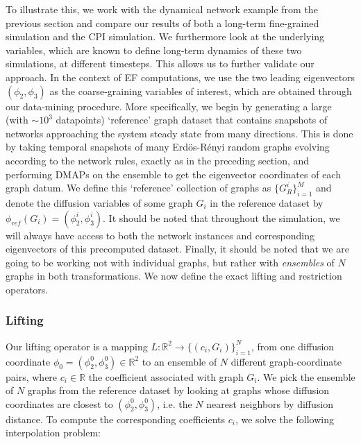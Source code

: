 To illustrate this, we work with the dynamical network example from
the previous section and compare our results of both a long-term
fine-grained simulation and the CPI simulation. We furthermore look at
the underlying variables, which are known to define long-term dynamics
of these two simulations, at different timesteps. This allows us to
further validate our approach. In the context of EF computations, we
use the two leading eigenvectors $(\phi_2, \phi_3)$ as the
coarse-graining variables of interest, which are obtained through our
data-mining procedure. More specifically, we begin by generating a
large (with $\sim 10^3$ datapoints) `reference' graph dataset that
contains snapshots of networks approaching the system steady state
from many directions. This is done by taking temporal snapshots of
many Erd\"{o}s-R\'{e}nyi random graphs evolving according to the
network rules, exactly as in the preceding section, and performing
DMAPs on the ensemble to get the eigenvector coordinates of each graph
datum. We define this `reference' collection of graphs as
$\{ G^i_R \}_{i = 1}^M$ and denote the diffusion variables of some
graph $G_i$ in the reference dataset by
$\phi_{ref}(G_i) = (\phi_2^i, \phi_3^i)$. It should be noted that
throughout the simulation, we will always have access to both the
network instances and corresponding eigenvectors of this precomputed
dataset. Finally, it should be noted that we are going to be working
not with individual graphs, but rather with {\em ensembles} of $N$
graphs in both transformations. We now define the exact lifting and
restriction operators.

\subsubsection{Lifting}

Our lifting operator is a mapping
$L: \mathbb{R}^2 \rightarrow \{(c_i,G_i)\}^N_{i = 1}$, from one
diffusion coordinate $\phi_0 = (\phi^0_2, \phi^0_3) \in \mathbb{R}^2$
to an ensemble of $N$ different graph-coordinate pairs, where
$c_i \in \mathbb{R}$ the coefficient associated with graph $G_i$. We
pick the ensemble of $N$ graphs from the reference dataset by looking
at graphs whose diffusion coordinates are closest to
$(\phi_2^0, \phi_3^0)$, i.e. the $N$ nearest neighbors by diffusion
distance. To compute the corresponding coefficients $c_i$, we solve
the following interpolation problem:

